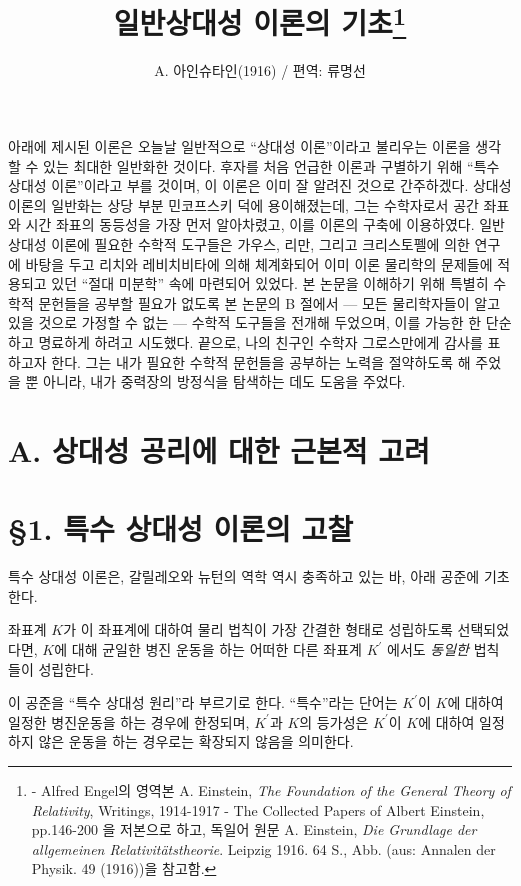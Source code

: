 \documentclass[b5paper]{article}
\title{일반상대성 이론의 기초\footnote{- Alfred Engel의 영역본 A. Einstein, \emph{The Foundation of the General Theory of Relativity}, Writings, 1914-1917 - The Collected Papers of Albert Einstein, pp.146-200 을 저본으로 하고, 독일어 원문 A. Einstein, \emph{Die Grundlage der allgemeinen Relativitätstheorie}. Leipzig 1916. 64 S., Abb. (aus: Annalen der Physik. 49 (1916))을 참고함.}}
\date{}
\author{\normalsize A. 아인슈타인(1916) / 편역: 류명선}
\begin{document}
\newcommand{\pderiv}[2]{{\frac{{\partial}{#1}}{{\partial}{#2}}}}
\newcommand{\ppderiv}[3]{{\frac{{\partial^2}{#1}}{{\partial}{#2}{\partial}{#3}}}}
\newcommand{\ilpderiv}[2]{{{{\partial}{#1}}/{{\partial}{#2}}}}
\newcommand{\ilppderiv}[3]{{\frac{{\partial^2}{#1}}/{{\partial}{#2}{\partial}{#3}}}}
\newcommand{\pppderiv}[4]{{\frac{{\partial^3}{#1}}{{\partial}{#2}{\partial}{#3}{\partial}{#4}}}}
\newcommand{\ind}{{색인}}

\maketitle

아래에 제시된 이론은 오늘날 일반적으로 ``상대성 이론''이라고 불리우는 이론을 생각할 수 있는 최대한 일반화한 것이다. 후자를 처음 언급한 이론과 구별하기 위해 ``특수 상대성 이론''이라고 부를 것이며, 이 이론은 이미 잘 알려진 것으로 간주하겠다. 상대성 이론의 일반화는 상당 부분 민코프스키 덕에 용이해졌는데, 그는 수학자로서 공간 좌표와 시간 좌표의 동등성을 가장 먼저 알아차렸고, 이를 이론의 구축에 이용하였다. 
일반 상대성 이론에 필요한 수학적 도구들은 가우스, 리만, 그리고 크리스토펠에 의한 연구에 바탕을 두고 리치와 레비치비타에 의해 체계화되어 이미 이론 물리학의 문제들에 적용되고 있던 ``절대 미분학'' 속에 마련되어 있었다. 본 논문을 이해하기 위해 특별히 수학적 문헌들을 공부할 필요가 없도록 본 논문의 B 절에서 --- 모든 물리학자들이 알고 있을 것으로 가정할 수 없는 --- 수학적 도구들을 전개해 두었으며, 이를 가능한 한 단순하고 명료하게 하려고 시도했다. 
끝으로, 나의 친구인 수학자 그로스만에게 감사를 표하고자 한다. 그는 내가 필요한 수학적 문헌들을 공부하는 노력을 절약하도록 해 주었을 뿐 아니라, 내가 중력장의 방정식을 탐색하는 데도 도움을 주었다.

\section*{A. 상대성 공리에 대한 근본적 고려}
\section*{\S 1. 특수 상대성 이론의 고찰}
특수 상대성 이론은, 갈릴레오와 뉴턴의 역학 역시 충족하고 있는 바, 아래 공준에 기초한다.

좌표계 $K$가 이 좌표계에 대하여 물리 법칙이 가장 간결한 형태로 성립하도록 선택되었다면, $K$에 대해 균일한 병진 운동을 하는 어떠한 다른 좌표계 $K^\prime$ 에서도 \emph{동일한} 법칙들이 성립한다.
 
이 공준을 ``특수 상대성 원리''라 부르기로 한다. ``특수''라는 단어는 $K^{\prime}$이 $K$에 대하여  일정한 병진운동을 하는 경우에 한정되며, $K^{\prime}$과 $K$의 등가성은 $K^{\prime}$이 $K$에 대하여 일정하지 않은 운동을 하는 경우로는 확장되지 않음을 의미한다. 
\end{document}
